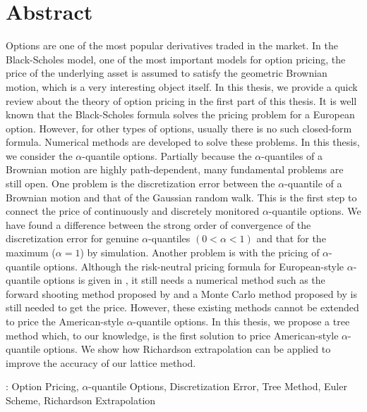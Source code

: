 \chapter{Abstract}
Options are one of the most popular derivatives traded in the market. 
In the Black-Scholes model, one of the most important models for option pricing, the price of the underlying asset is assumed to satisfy the geometric Brownian motion, which is a very interesting object itself. In this thesis, we provide a quick review about the theory of option pricing in the first part of this thesis. It is well known that the Black-Scholes formula solves the pricing problem for a European option. However, for other types of options, usually there is no such closed-form formula. Numerical methods are developed to solve these problems. In this thesis, we consider the $\alpha$-quantile options. Partially because the $\alpha$-quantiles of a Brownian motion are highly path-dependent, many fundamental problems are still open. One problem is the discretization error between the $\alpha$-quantile of a Brownian motion and that of the Gaussian random walk. This is the first step to connect the price of continuously and discretely monitored $\alpha$-quantile options. We have found a difference between the strong order of convergence of the discretization error for genuine $\alpha$-quantiles $(0< \alpha < 1)$ and that for the maximum ($\alpha=1$) by simulation. Another problem is with the pricing of $\alpha$-quantile options. Although the risk-neutral pricing formula for European-style $\alpha$-quantile options is given in \cite{Dassios1995}, it still needs a numerical method such as the forward shooting method proposed by \cite{Kwok2001} and a Monte Carlo method proposed by \cite{Laura2001} is still needed to get the price. However, these existing methods cannot be extended to price the American-style $\alpha$-quantile options. In this thesis, we propose a tree method which, to our knowledge, is the first solution to price American-style $\alpha$-quantile options. We show how Richardson extrapolation can be applied to improve the accuracy of our lattice method. 
\vspace{1cm}

: Option Pricing, $\alpha$-quantile Options, Discretization Error, Tree Method, Euler Scheme, Richardson Extrapolation
